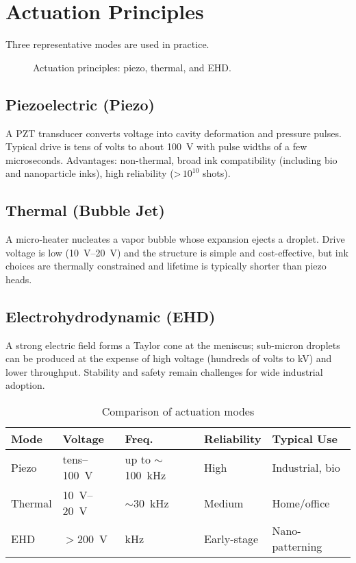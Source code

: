 \documentclass[conference]{IEEEtran}
\begin{document}
\section{Actuation Principles}
Three representative modes are used in practice.

\begin{figure}[!t]
  \centering
  
  \caption{Actuation principles: piezo, thermal, and EHD.}
  \label{fig:actuation_modes}
\end{figure}

\subsection{Piezoelectric (Piezo)}
A PZT transducer converts voltage into cavity deformation and pressure pulses. Typical drive is tens of volts to about \SI{100}{V} with pulse widths of a few microseconds. Advantages: non-thermal, broad ink compatibility (including bio and nanoparticle inks), high reliability (>\,$10^{10}$ shots).

\subsection{Thermal (Bubble Jet)}
A micro-heater nucleates a vapor bubble whose expansion ejects a droplet. Drive voltage is low (\SIrange{10}{20}{V}) and the structure is simple and cost-effective, but ink choices are thermally constrained and lifetime is typically shorter than piezo heads.

\subsection{Electrohydrodynamic (EHD)}
A strong electric field forms a Taylor cone at the meniscus; sub-micron droplets can be produced at the expense of high voltage (hundreds of volts to kV) and lower throughput. Stability and safety remain challenges for wide industrial adoption.

\begin{table}[!t]
\caption{Comparison of actuation modes}
\label{tab:actuation}
\centering\footnotesize
\begin{tabular*}{\columnwidth}{@{\extracolsep{\fill}}lllll@{}}
\toprule
Mode & Voltage & Freq. & Reliability & Typical Use \\
\midrule
Piezo   & tens--\SI{100}{V} & up to $\sim$\SI{100}{kHz} & High   & Industrial, bio \\
Thermal & \SIrange{10}{20}{V} & $\sim$\SI{30}{kHz}       & Medium & Home/office \\
EHD     & $>$\SI{200}{V}    & kHz                       & Early-stage & Nano-patterning \\
\bottomrule
\end{tabular*}
\end{table}
\end{document}
